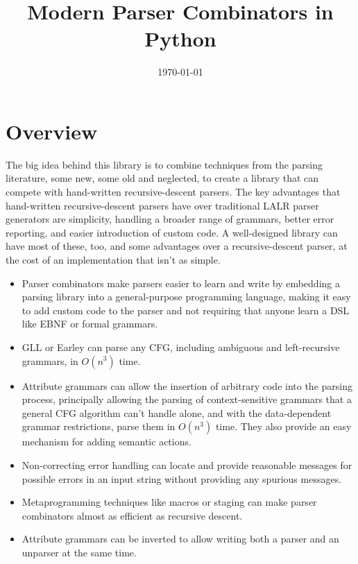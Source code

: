 \documentclass[12pt]{article}
\title{Modern Parser Combinators in Python}
\date{\today}
\begin{document}
\maketitle

\tableofcontents

\section{Overview}
\label{sec:overview}

The big idea behind this library is to combine techniques from the
parsing literature, some new, some old and neglected, to create a
library that can compete with hand-written recursive-descent parsers.
The key advantages that hand-written recursive-descent parsers have
over traditional LALR parser generators are simplicity, handling a
broader range of grammars, better error reporting, and easier
introduction of custom code.  A well-designed library can have most of
these, too, and some advantages over a recursive-descent parser, at
the cost of an implementation that isn't as simple.

\begin{itemize}
\item Parser combinators make parsers easier to learn and write by
  embedding a parsing library into a general-purpose programming
  language, making it easy to add custom code to the parser and not
  requiring that anyone learn a DSL like EBNF or formal grammars.
\item GLL or Earley can parse any CFG, including ambiguous and
  left-recursive grammars, in $O(n^3)$ time.  %
\item Attribute grammars can allow the insertion of arbitrary code
  into the parsing process, principally allowing the parsing of
  context-sensitive grammars that a general CFG algorithm can't handle
  alone, and with the data-dependent grammar restrictions, parse them
  in $O(n^3)$ time.  They also provide an easy mechanism for adding
  semantic actions.
\item Non-correcting error handling can locate and provide reasonable
  messages for possible errors in an input string without
  providing any spurious messages.
\item Metaprogramming techniques like macros or staging can make
  parser combinators almost as efficient as recursive descent.
\item Attribute grammars can be inverted to allow writing both a
  parser and an unparser at the same time.
\end{itemize}
\end{document}
